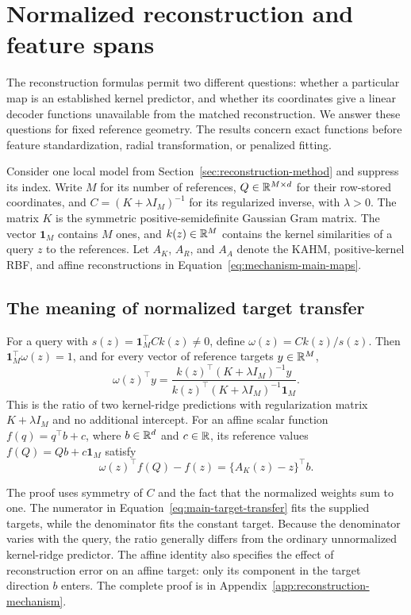 \section{Normalized reconstruction and feature spans}
\label{sec:reconstruction-theory}

The reconstruction formulas permit two different questions: whether a
particular map is an established kernel predictor, and whether its
coordinates give a linear decoder functions unavailable from the matched
reconstruction. We answer these questions for fixed reference geometry.
The results concern exact functions before feature standardization,
radial transformation, or penalized fitting.

Consider one local model from Section~\ref{sec:reconstruction-method} and
suppress its index. Write $M$ for its number of references,
$Q\in\mathbb{R}^{M\times d}$ for their row-stored coordinates, and
$C=(K+\lambda I_M)^{-1}$ for its regularized inverse, with $\lambda>0$.
The matrix $K$ is the symmetric positive-semidefinite Gaussian Gram
matrix. The vector $\mathbf1_M$ contains $M$ ones, and $k(z)\in\mathbb{R}^M$
contains the kernel similarities of a query $z$ to the references.
Let $A_K$, $A_R$, and $A_A$ denote the KAHM, positive-kernel RBF, and
affine reconstructions in Equation~\eqref{eq:mechanism-main-maps}.

\subsection{The meaning of normalized target transfer}

\begin{proposition}
\label{prop:mechanism-krr}
For a query with $s(z)=\mathbf1_M^\top Ck(z)\ne0$, define
$\omega(z)=Ck(z)/s(z)$. Then $\mathbf1_M^\top\omega(z)=1$, and for
every vector of reference targets $y\in\mathbb{R}^M$,
\begin{equation}
 \omega(z)^\top y
 =\frac{k(z)^\top(K+\lambda I_M)^{-1}y}
 {k(z)^\top(K+\lambda I_M)^{-1}\mathbf1_M}.
 \label{eq:main-target-transfer}
\end{equation}
This is the ratio of two kernel-ridge predictions with regularization
matrix $K+\lambda I_M$ and no additional intercept. For an affine scalar
function $f(q)=q^\top b+c$, where $b\in\mathbb{R}^d$ and $c\in\mathbb{R}$, its
reference values $f(Q)=Qb+c\mathbf1_M$ satisfy
\[
 \omega(z)^\top f(Q)-f(z)=\{A_K(z)-z\}^\top b.
\]
\end{proposition}

The proof uses symmetry of $C$ and the fact that the normalized weights
sum to one. The numerator in Equation~\eqref{eq:main-target-transfer}
fits the supplied targets, while the denominator fits the constant
target. Because the denominator varies with the query, the ratio
generally differs from the ordinary unnormalized kernel-ridge predictor.
The affine identity also specifies the effect of reconstruction error on
an affine target: only its component in the target direction $b$ enters.
The complete proof is in Appendix~\ref{app:reconstruction-mechanism}.

